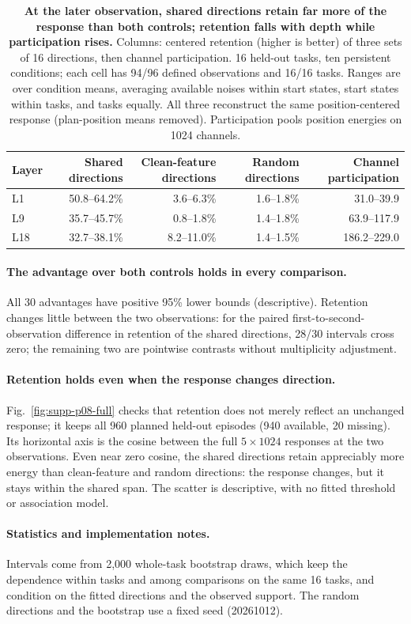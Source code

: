 \begin{table}[t]\centering\small
\caption{\textbf{At the later observation, shared directions retain far more of the response than both controls; retention falls with depth while participation rises.} Columns: centered retention (higher is better) of three sets of 16 directions, then channel participation. 16 held-out tasks, ten persistent conditions; each cell has 94/96 defined observations and 16/16 tasks. Ranges are over condition means, averaging available noises within start states, start states within tasks, and tasks equally. All three reconstruct the same position-centered response (plan-position means removed). Participation pools position energies on 1024 channels.}
\label{tab:p08-dynamic-ranges}
\begin{tabular}{lrrrr}\toprule
Layer & Shared directions & Clean-feature directions & Random directions & Channel participation\\\midrule
L1 & 50.8--64.2\% & 3.6--6.3\% & 1.6--1.8\% & 31.0--39.9\\
L9 & 35.7--45.7\% & 0.8--1.8\% & 1.4--1.8\% & 63.9--117.9\\
L18 & 32.7--38.1\% & 8.2--11.0\% & 1.4--1.5\% & 186.2--229.0\\\bottomrule
\end{tabular}
\end{table}

\paragraph{The advantage over both controls holds in every comparison.}
All 30 advantages have positive 95\% lower bounds (descriptive). Retention changes little between the two observations: for the paired first-to-second-observation difference in retention of the shared directions, 28/30 intervals cross zero; the remaining two are pointwise contrasts without multiplicity adjustment.

\paragraph{Retention holds even when the response changes direction.}
Fig.~\ref{fig:supp-p08-full} checks that retention does not merely reflect an unchanged response; it keeps all 960 planned held-out episodes (940 available, 20 missing). Its horizontal axis is the cosine between the full $5\times1024$ responses at the two observations. Even near zero cosine, the shared directions retain appreciably more energy than clean-feature and random directions: the response changes, but it stays within the shared span. The scatter is descriptive, with no fitted threshold or association model.

\paragraph{Statistics and implementation notes.}
Intervals come from 2,000 whole-task bootstrap draws, which keep the dependence within tasks and among comparisons on the same 16 tasks, and condition on the fitted directions and the observed support. The random directions and the bootstrap use a fixed seed (20261012).
